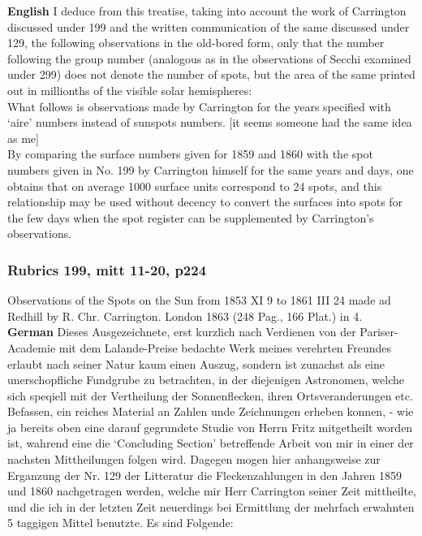 \documentclass[12pt]{article}
\begin{document}
\textbf{English}
I deduce from this treatise, taking into account the work of Carrington discussed under 199 and the written communication of the same discussed under 129, the following observations in the old-bored form, only that the number following the group number (analogous as in the observations of Secchi examined under 299) does not denote the number of spots, but the area of the same printed out in millionths of the visible solar hemispheres:\\

What follows is observations made by Carrington for the years specified with `aire' numbers instead of sunspots numbers. [it seems someone had the same idea as me]\\

By comparing the surface numbers given for 1859 and 1860 with the spot numbers given in No. 199 by Carrington himself for the same years and days, one obtains that on average 1000 surface units correspond to 24 spots, and this relationship may be used without decency to convert the surfaces into spots for the few days when the spot register can be supplemented by Carrington's observations.

\subsubsection{Rubrics 199, mitt 11-20, p224}

Observations of the Spots on the Sun from 1853 XI 9 to 1861 III 24 made ad Redhill by R. Chr. Carrington. London 1863 (248 Pag., 166 Plat.) in 4.\\

\textbf{German} 
Dieses Ausgezeichnete, erst kurzlich nach Verdienen von der Pariser-Academie mit dem Lalande-Preise bedachte Werk meines verehrten Freundes erlaubt nach seiner Natur kaum einen Auszug, sondern ist zunachst als eine unerschopfliche Fundgrube zu betrachten, in der diejenigen Astronomen, welche sich speqiell mit der Vertheilung der Sonnenflecken, ihren Ortsveranderungen etc. Befassen, ein reiches Material an Zahlen unde Zeichnungen erheben konnen, - wie ja bereits oben eine darauf gegrundete Studie von Herrn Fritz mitgetheilt worden ist, wahrend eine die `Concluding Section' betreffende Arbeit von mir in einer der nachsten Mittheilungen folgen wird. Dagegen mogen hier anhangsweise zur Erganzung der Nr. 129 der Litteratur die Fleckenzahlungen in den Jahren 1859 und 1860 nachgetragen werden, welche mir Herr Carrington seiner Zeit mittheilte, und die ich in der letzten Zeit neuerdings bei Ermittlung der mehrfach erwahnten 5 taggigen Mittel benutzte. Es sind Folgende:\\
\end{document}
